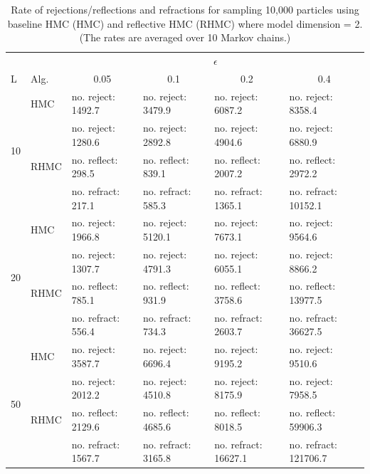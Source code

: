 \documentclass{article} %
\begin{document}
\begin {table}
\caption {Rate of rejections/reflections and refractions for sampling 10,000 particles using baseline HMC (HMC) and reflective HMC (RHMC) where model dimension = 2.
(The rates are averaged over 10 Markov chains.)   
} \label{tab1} 
\center
\begin{tabular}{llllll} 
\hline 
 & &\multicolumn{4}{c}{$\epsilon$} \\ 
\cline{3-6} L & Alg.& \multicolumn{1}{c}{0.05} & \multicolumn{1}{c}{0.1} & \multicolumn{1}{c}{0.2} & \multicolumn{1}{c}{0.4}\\ 
\hline 
%
\multirow{4}{*}{10}& HMC &  no. reject: 1492.7& no. reject: 3479.9 & no. reject: 6087.2& no. reject: 8358.4\vspace{3pt}\\
%
& \multirow{3}{*}{RHMC}& no. reject: 1280.6& no. reject: 2892.8& no. reject: 4904.6& no. reject: 6880.9\\ 
& &        no. reflect: 298.5& no. reflect: 839.1& no. reflect: 2007.2& no. reflect: 2972.2\\ 
& &          no. refract: 217.1& no. refract: 585.3& no. refract: 1365.1& no. refract: 10152.1\vspace{12pt}\\ 
\multirow{4}{*}{20}& HMC &  no. reject: 1966.8& no. reject: 5120.1 & no. reject: 7673.1& no. reject: 9564.6\vspace{3pt}\\
%
& \multirow{3}{*}{RHMC}& no. reject: 1307.7& no. reject: 4791.3& no. reject: 6055.1& no. reject: 8866.2\\ 
& &        no. reflect: 785.1& no. reflect: 931.9& no. reflect: 3758.6& no. reflect: 13977.5\\ 
& &          no. refract: 556.4& no. refract: 734.3& no. refract: 2603.7& no. refract: 36627.5\vspace{12pt}\\ 
\multirow{4}{*}{50}& HMC &  no. reject: 3587.7& no. reject: 6696.4 & no. reject: 9195.2& no. reject: 9510.6\vspace{3pt}\\
%
& \multirow{3}{*}{RHMC}& no. reject: 2012.2& no. reject: 4510.8& no. reject: 8175.9& no. reject: 7958.5\\ 
& &        no. reflect: 2129.6& no. reflect: 4685.6& no. reflect: 8018.5& no. reflect: 59906.3\\ 
& &          no. refract: 1567.7& no. refract: 3165.8& no. refract: 16627.1& no. refract: 121706.7\vspace{12pt}\\ 

\end{tabular}
\end{table}
\end{document}
